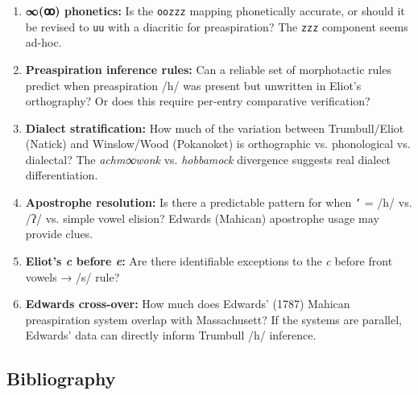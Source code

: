 \begin{enumerate}
  \item \textbf{∞(ꝏ) phonetics:} Is the \texttt{oozzz} mapping phonetically
    accurate, or should it be revised to \texttt{uu} with a diacritic for
    preaspiration? The \texttt{zzz} component seems ad-hoc.
  \item \textbf{Preaspiration inference rules:} Can a reliable set of
    morphotactic rules predict when preaspiration /h/ was present but unwritten
    in Eliot's orthography? Or does this require per-entry comparative
    verification?
  \item \textbf{Dialect stratification:} How much of the variation between
    Trumbull/Eliot (Natick) and Winslow/Wood (Pokanoket) is orthographic vs.
    phonological vs. dialectal? The \textit{achm∞wonk} vs. \textit{hobbamock}
    divergence suggests real dialect differentiation.
  \item \textbf{Apostrophe resolution:} Is there a predictable pattern for when
    \texttt{'} = /h/ vs. /ʔ/ vs. simple vowel elision? Edwards (Mahican)
    apostrophe usage may provide clues.
  \item \textbf{Eliot's \textit{c} before \textit{e}:} Are there identifiable
    exceptions to the \textit{c} before front vowels → /s/ rule?
  \item \textbf{Edwards cross-over:} How much does Edwards' (1787) Mahican
    preaspiration system overlap with Massachusett? If the systems are
    parallel, Edwards' data can directly inform Trumbull /h/ inference.
\end{enumerate}

\subsection{Bibliography}

